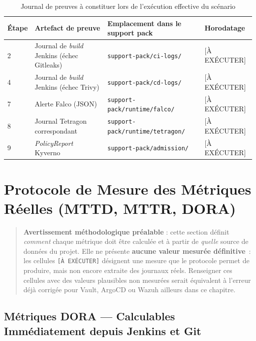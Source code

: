 \begin{table}[htbp]
\centering
\scriptsize
\begin{tabular}{@{}p{2cm}p{4.4cm}p{4.4cm}p{2.4cm}@{}}
\toprule
\textbf{Étape} & \textbf{Artefact de preuve} & \textbf{Emplacement dans le support pack} & \textbf{Horodatage} \\
\midrule
2 & Journal de \textit{build} Jenkins (échec Gitleaks) & \texttt{support-pack/ci-logs/} & [À EXÉCUTER] \\
4 & Journal de \textit{build} Jenkins (échec Trivy) & \texttt{support-pack/cd-logs/} & [À EXÉCUTER] \\
7 & Alerte Falco (JSON) & \texttt{support-pack/runtime/falco/} & [À EXÉCUTER] \\
8 & Journal Tetragon correspondant & \texttt{support-pack/runtime/tetragon/} & [À EXÉCUTER] \\
9 & \textit{PolicyReport} Kyverno & \texttt{support-pack/admission/} & [À EXÉCUTER] \\
\bottomrule
\end{tabular}
\caption{Journal de preuves à constituer lors de l'exécution effective du scénario}
\label{tab:journal_preuves_scenario}
\end{table}


\section{Protocole de Mesure des Métriques Réelles (MTTD, MTTR, DORA)}
\label{sec:metriques_reelles}

\begin{quote}
\textbf{Avertissement méthodologique préalable} : cette section définit \emph{comment} chaque métrique doit être calculée et à partir de \emph{quelle} source de données du projet. Elle ne présente \textbf{aucune valeur mesurée définitive}~: les cellules \texttt{[À EXÉCUTER]} désignent une mesure que le protocole permet de produire, mais non encore extraite des journaux réels. Renseigner ces cellules avec des valeurs plausibles non mesurées serait équivalent à l'erreur déjà corrigée pour Vault, ArgoCD ou Wazuh ailleurs dans ce chapitre.
\end{quote}

\subsection{Métriques DORA — Calculables Immédiatement depuis Jenkins et Git}

